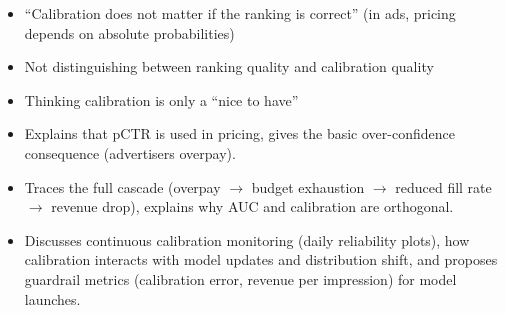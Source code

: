 \begin{interviewq}
\redflags
\begin{itemize}
    \item ``Calibration does not matter if the ranking is correct'' (in ads, pricing depends on absolute probabilities)
    \item Not distinguishing between ranking quality and calibration quality
    \item Thinking calibration is only a ``nice to have''
\end{itemize}


\goodgreat
\begin{itemize}
    \item {} Explains that pCTR is used in pricing, gives the basic over-confidence consequence (advertisers overpay).
    \item {} Traces the full cascade (overpay $\rightarrow$ budget exhaustion $\rightarrow$ reduced fill rate $\rightarrow$ revenue drop), explains why AUC and calibration are orthogonal.
    \item {} Discusses continuous calibration monitoring (daily reliability plots), how calibration interacts with model updates and distribution shift, and proposes guardrail metrics (calibration error, revenue per impression) for model launches.
\end{itemize}

\end{interviewq}

